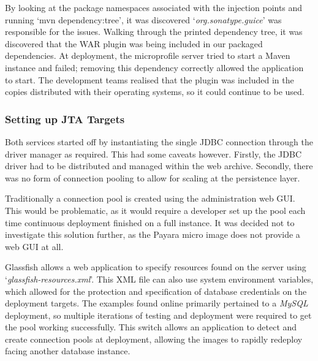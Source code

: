 By looking at the package namespaces associated with the injection points and running `mvn dependency:tree', it was discovered `\textit{org.sonatype.guice}' was responsible for the issues. Walking through the printed dependency tree, it was discovered that the WAR plugin was being included in our packaged dependencies. At deployment, the microprofile server tried to start a Maven instance and failed; removing this dependency correctly allowed the application to start. The development teams realised that the plugin was included in the copies distributed with their operating systems, so it could continue to be used.

\label{JTA_Targets}
\subsubsection{Setting up JTA Targets}
Both services started off by instantiating the single JDBC connection through the driver manager as required. This had some caveats however. Firstly, the JDBC driver had to be distributed and managed within the web archive. Secondly, there was no form of connection pooling to allow for scaling at the persistence layer.

Traditionally a connection pool is created using the administration web GUI. This would be problematic, as it would require a developer set up the pool each time continuous deployment finished on a full instance.  It was decided not to investigate this solution further, as the Payara micro image does not provide a web GUI at all.

Glassfish allows a web application to specify resources found on the server using `\textit{glassfish-resources.xml}'. This XML file can also use system environment variables, which allowed for the protection and specification of database credentials on the deployment targets. The examples found online primarily pertained to a \textit{MySQL} deployment, so multiple iterations of testing and deployment were required to get the pool working successfully. This switch allows an application to detect and create connection pools at deployment, allowing the images to rapidly redeploy facing another database instance.
